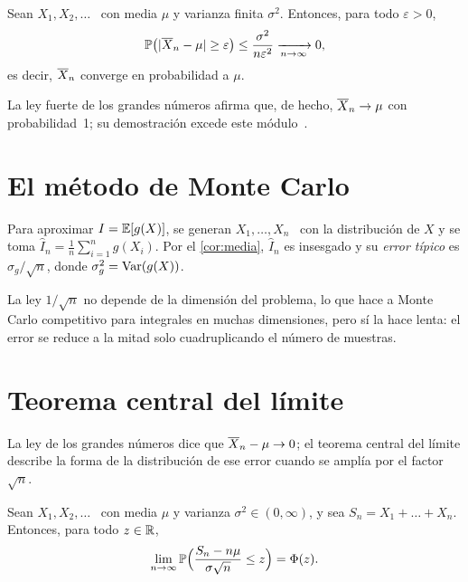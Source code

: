 \begin{teorema}\label{teo:lgn}
Sean $X_1,X_2,\dots$ \iid\ con media $\mu$ y varianza finita $\sigma^{2}$. Entonces, para todo $\varepsilon>0$,
\[
\mathbb{P}\bigl(\lvert\overline{X}_n-\mu\rvert\ge\varepsilon\bigr)\le\frac{\sigma^{2}}{n\varepsilon^{2}}\xrightarrow[n\to\infty]{}0,
\]
es decir, $\overline{X}_n$ converge en probabilidad a $\mu$.
\end{teorema}

La ley fuerte de los grandes números afirma que, de hecho, $\overline{X}_n\to\mu$ con probabilidad~1; su demostración excede este módulo~\cite[§5.5]{bt}.

\section{El método de Monte Carlo}

\begin{definicion}\label{def:montecarlo}
Para aproximar $I=\mathbb{E}[g(X)]$, se generan $X_1,\dots,X_n$ \iid\ con la distribución de $X$ y se toma $\hat I_n=\frac1n\sum_{i=1}^{n}g(X_i)$. Por el \cref{cor:media}, $\hat I_n$ es insesgado y su \emph{error típico} es $\sigma_g/\sqrt n$, donde $\sigma_g^{2}=\operatorname{Var}(g(X))$.
\end{definicion}

\addtocounter{definicion}{1}%

La ley $1/\sqrt n$ no depende de la dimensión del problema, lo que hace a Monte Carlo competitivo para integrales en muchas dimensiones, pero sí la hace lenta: el error se reduce a la mitad solo cuadruplicando el número de muestras.

\addtocounter{definicion}{1}%

\section{Teorema central del límite}

La ley de los grandes números dice que $\overline{X}_n-\mu\to 0$; el teorema central del límite describe la forma de la distribución de ese error cuando se amplía por el factor $\sqrt n$.

\begin{teorema}\label{teo:tcl}
Sean $X_1,X_2,\dots$ \iid\ con media $\mu$ y varianza $\sigma^{2}\in(0,\infty)$, y sea $S_n=X_1+\dots+X_n$. Entonces, para todo $z\in\mathbb{R}$,
\[
\lim_{n\to\infty}\mathbb{P}\Bigl(\frac{S_n-n\mu}{\sigma\sqrt n}\le z\Bigr)=\Phi(z).
\]
\end{teorema}

